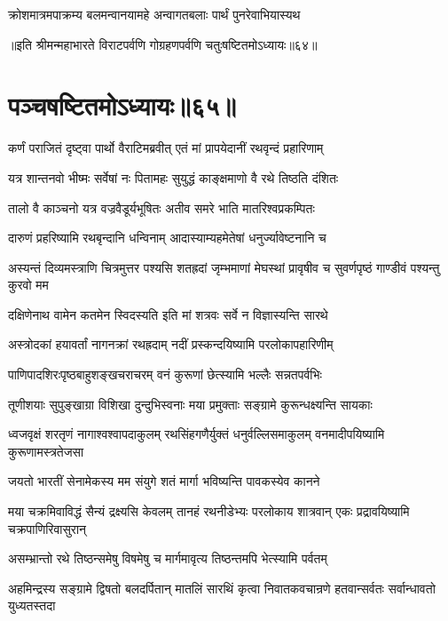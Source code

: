 \twolineshloka
{क्रोशमात्रमपाक्रम्य बलमन्वानयामहे}
{अन्वागतबलाः पार्थं पुनरेवाभियास्यथ}

॥इति श्रीमन्महाभारते विराटपर्वणि गोग्रहणपर्वणि चतुःषष्टितमोऽध्यायः॥६४॥

\chapter{पञ्चषष्टितमोऽध्यायः॥६५॥}

\twolineshloka
{कर्णं पराजितं दृष्ट्वा पार्थो वैराटिमब्रवीत्}
{एतं मां प्रापयेदानीं रथवृन्दं प्रहारिणाम्}


\twolineshloka
{यत्र शान्तनवो भीष्मः सर्वेषां नः पितामहः}
{सुयुद्धं काङ्क्षमाणो वै रथे तिष्ठति दंशितः}


\twolineshloka
{तालो वै काञ्चनो यत्र वज्रवैडूर्यभूषितः}
{अतीव समरे भाति मातरिश्वप्रकम्पितः}


\twolineshloka
{दारुणं प्रहरिष्यामि रथबृन्दानि धन्विनाम्}
{आदास्याम्यहमेतेषां धनुर्ज्यावेष्टनानि च}


\onelineshloka
{अस्यन्तं दिव्यमस्त्राणि चित्रमुत्तर पश्यसि}
\twolineshloka
{शतह्रदां जृम्भमाणां मेघस्थां प्रावृषीव च}
{सुवर्णपृष्ठं गाण्डीवं पश्यन्तु कुरवो मम}


\twolineshloka
{दक्षिणेनाथ वामेन कतमेन स्विदस्यति}
{इति मां शत्रवः सर्वे न विज्ञास्यन्ति सारथे}


\twolineshloka
{अस्त्रोदकां हयावर्तां नागनक्रां रथह्रदाम्}
{नदीं प्रस्कन्दयिष्यामि परलोकापहारिणीम्}


\twolineshloka
{पाणिपादशिरःपृष्ठबाहुशङ्खचराचरम्}
{वनं कुरूणां छेत्स्यामि भल्लैः सन्नतपर्वभिः}


\twolineshloka
{तूणीशयाः सुपुङ्खाग्रा विशिखा दुन्दुभिस्वनाः}
{मया प्रमुक्ताः सङ्ग्रामे कुरून्धक्ष्यन्ति सायकाः}


\threelineshloka
{ध्वजवृक्षं शरतृणं नागाश्वश्वापदाकुलम्}
{रथसिंहगणैर्युक्तं धनुर्वल्लिसमाकुलम्}
{वनमादीपयिष्यामि कुरूणामस्त्रतेजसा}


\twolineshloka
{जयतो भारतीं सेनामेकस्य मम संयुगे}
{शतं मार्गा भविष्यन्ति पावकस्येव कानने}


\threelineshloka
{मया चक्रमिवाविद्धं सैन्यं द्रक्ष्यसि केवलम्}
{तानहं रथनीडेभ्यः परलोकाय शात्रवान्}
{एकः प्रद्रावयिष्यामि चक्रपाणिरिवासुरान्}


\twolineshloka
{असम्भ्रान्तो रथे तिष्ठन्समेषु विषमेषु च}
{मार्गमावृत्य तिष्ठन्तमपि भेत्स्यामि पर्वतम्}


\threelineshloka
{अहमिन्द्रस्य सङ्ग्रामे द्विषतो बलदर्पितान्}
{मातलिं सारथिं कृत्वा निवातकवचान्रणे}
{हतवान्सर्वतः सर्वान्धावतो युध्यतस्तदा}


